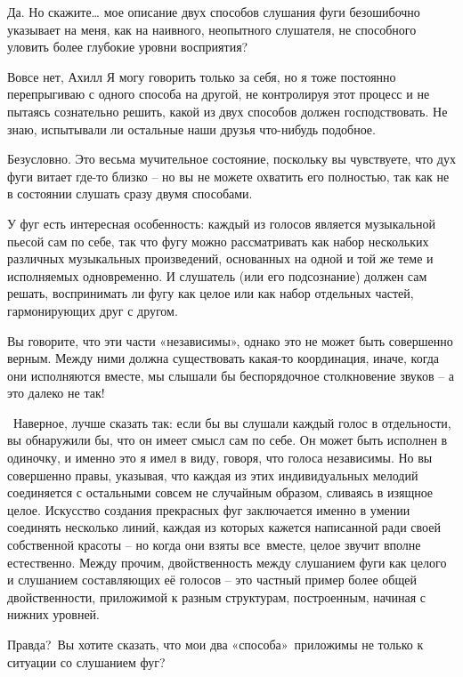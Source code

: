 \documentclass[../main.tex]{subfiles}
\begin{document}
\begin{dialogue}
 Да. Но скажите\ldots{} мое описание двух способов слушания фуги безошибочно указывает на меня, как на наивного, неопытного слушателя, не способного уловить более глубокие уровни восприятия?

 Вовсе нет, Ахилл Я могу говорить только за себя, но я тоже постоянно перепрыгиваю с одного способа на другой, не контролируя этот процесс и не пытаясь сознательно решить, какой из двух способов должен господствовать. Не знаю, испытывали ли остальные наши друзья что-нибудь подобное.

 Безусловно. Это весьма мучительное состояние, поскольку вы чувствуете, что дух фуги витает где-то близко \--- но вы не можете охватить его полностью, так как не в состоянии слушать сразу двумя способами.

 У фуг есть интересная особенность: каждый из голосов является музыкальной пьесой сам по себе, так что фугу можно рассматривать как набор нескольких различных музыкальных произведений, основанных на одной и той же теме и исполняемых одновременно. И слушатель (или его подсознание) должен сам решать, воспринимать ли фугу как целое или как набор отдельных частей, гармонирующих друг с другом.

 Вы говорите, что эти части «независимы», однако это не может быть совершенно верным. Между ними должна существовать какая-то координация, иначе, когда они исполняются вместе, мы слышали бы беспорядочное столкновение звуков \--- а это далеко не так!

~Наверное, лучше сказать так: если бы вы слушали каждый голос в отдельности, вы обнаружили бы, что он имеет смысл сам по себе. Он может быть исполнен в одиночку, и именно это я имел в виду, говоря, что голоса независимы. Но вы совершенно правы, указывая, что каждая из этих индивидуальных мелодий соединяется с остальными совсем не случайным образом, сливаясь в изящное целое. Искусство создания прекрасных фуг заключается именно в умении соединять несколько линий, каждая из которых кажется написанной ради своей собственной красоты \--- но когда они взяты все~вместе, целое звучит вполне естественно. Между прочим, двойственность между слушанием фуги как целого и слушанием составляющих её голосов \--- это частный пример более общей двойственности, приложимой к разным структурам, построенным, начиная с нижних уровней.

 Правда?~Вы хотите сказать, что мои два «способа»~приложимы не только к ситуации со слушанием фуг?


\end{dialogue}
\end{document}
